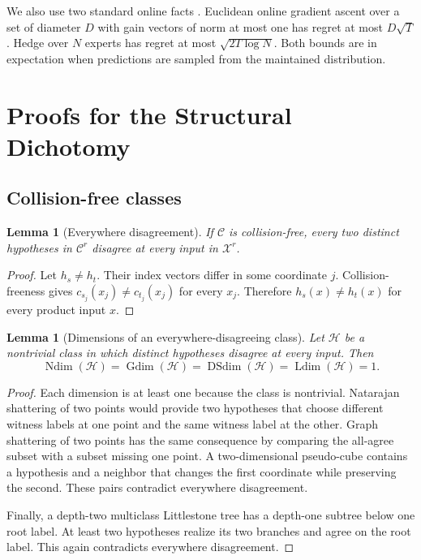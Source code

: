 \documentclass[twoside]{article}
\newtheorem{lemma}[theorem]{Lemma}
\newcommand{\C}{\mathcal C}
\newcommand{\Ldim}{\operatorname{Ldim}}
\newcommand{\Ndim}{\operatorname{Ndim}}
\newcommand{\Gdim}{\operatorname{Gdim}}
\newcommand{\DSdim}{\operatorname{DSdim}}
\begin{document}
We also use two standard online facts \citep{cesabianchi2006}. Euclidean online gradient ascent over a set of diameter $D$ with gain vectors of norm at most one has regret at most $D\sqrt T$. Hedge over $N$ experts has regret at most $\sqrt{2T\log N}$. Both bounds are in expectation when predictions are sampled from the maintained distribution.

\section{Proofs for the Structural Dichotomy}
\label{app:dimensions}

\subsection{Collision-free classes}

\begin{lemma}[Everywhere disagreement]
\label{lem:everywhere}
If $\C$ is collision-free, every two distinct hypotheses in $\C^r$ disagree at every input in $\mathcal X^r$.
\end{lemma}

\begin{proof}
Let $h_s\neq h_t$. Their index vectors differ in some coordinate $j$. Collision-freeness gives $c_{s_j}(x_j)\neq c_{t_j}(x_j)$ for every $x_j$. Therefore $h_s(x)\neq h_t(x)$ for every product input $x$.
\end{proof}

\begin{lemma}[Dimensions of an everywhere-disagreeing class]
\label{lem:everywhere-dim}
Let $\mathcal H$ be a nontrivial class in which distinct hypotheses disagree at every input. Then
\[
 \Ndim(\mathcal H)=\Gdim(\mathcal H)=\DSdim(\mathcal H)=\Ldim(\mathcal H)=1.
\]
\end{lemma}

\begin{proof}
Each dimension is at least one because the class is nontrivial. Natarajan shattering of two points would provide two hypotheses that choose different witness labels at one point and the same witness label at the other. Graph shattering of two points has the same consequence by comparing the all-agree subset with a subset missing one point. A two-dimensional pseudo-cube contains a hypothesis and a neighbor that changes the first coordinate while preserving the second. These pairs contradict everywhere disagreement.

Finally, a depth-two multiclass Littlestone tree has a depth-one subtree below one root label. At least two hypotheses realize its two branches and agree on the root label. This again contradicts everywhere disagreement.
\end{proof}
\end{document}
